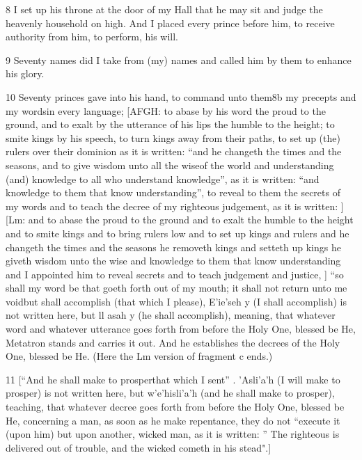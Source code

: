 \par 8 I set up his throne at the door of my Hall that he may sit and judge the heavenly household on high. And I placed every prince before him, to receive authority from him, to perform, his will. 

\par 9 Seventy names did I take from (my) names and called him by them to enhance his glory. 

\par 10 Seventy princes gave into his hand, to command unto them8b my precepts and my wordsin every language; [AFGH: to abase by his word the proud to the ground, and to exalt by the utterance of his lips the humble to the height; to smite kings by his speech, to turn kings away from their paths, to set up (the) rulers over their dominion as it is written: “and he changeth the times and the seasons, and to give wisdom unto all the wiseof the world and understanding (and) knowledge to all who understand knowledge”, as it is written: “and knowledge to them that know understanding”, to reveal to them the secrets of my words and to teach the decree of my righteous judgement, as it is written: ] [Lm: and to abase the proud to the ground and to exalt the humble to the height and to smite kings and to bring rulers low and to set up kings and rulers and he changeth the times and the seasons he removeth kings and setteth up kings he giveth wisdom unto the wise and knowledge to them that know understanding and I appointed him to reveal secrets and to teach judgement and justice, ] “so shall my word be that goeth forth out of my mouth; it shall not return unto me voidbut shall accomplish (that which I please), E'ie'seh y (I shall accomplish) is not written here, but ll asah y (he shall accomplish), meaning, that whatever word and whatever utterance goes forth from before the Holy One, blessed be He, Metatron stands and carries it out. And he establishes the decrees of the Holy One, blessed be He. (Here the Lm version of fragment c ends.) 

\par 11 [“And he shall make to prosperthat which I sent” . 'Asli'a'h (I will make to prosper) is not written here, but w'e'hisli'a'h (and he shall make to prosper), teaching, that whatever decree goes forth from before the Holy One, blessed be He, concerning a man, as soon as he make repentance, they do not “execute it (upon him) but upon another, wicked man, as it is written: ” The righteous is delivered out of trouble, and the wicked cometh in his stead".] 

